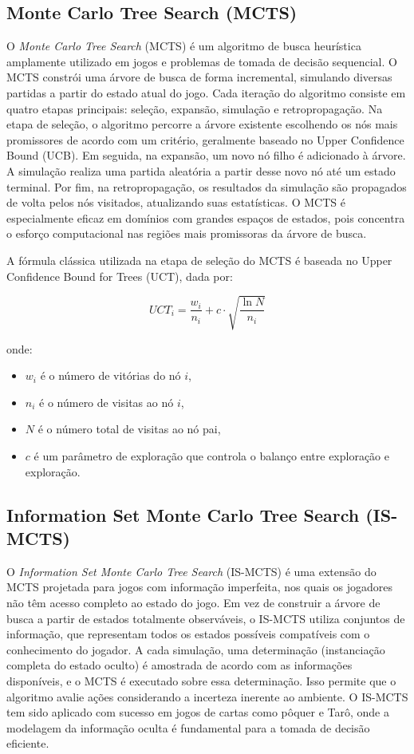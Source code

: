 \documentclass[12pt]{article}
\begin{document}
\subsection{Monte Carlo Tree Search (MCTS)}

O \textit{Monte Carlo Tree Search} (MCTS) é um algoritmo de busca heurística amplamente utilizado em jogos e problemas de tomada de decisão sequencial. O MCTS constrói uma árvore de busca de forma incremental, simulando diversas partidas a partir do estado atual do jogo. Cada iteração do algoritmo consiste em quatro etapas principais: seleção, expansão, simulação e retropropagação. Na etapa de seleção, o algoritmo percorre a árvore existente escolhendo os nós mais promissores de acordo com um critério, geralmente baseado no Upper Confidence Bound (UCB). Em seguida, na expansão, um novo nó filho é adicionado à árvore. A simulação realiza uma partida aleatória a partir desse novo nó até um estado terminal. Por fim, na retropropagação, os resultados da simulação são propagados de volta pelos nós visitados, atualizando suas estatísticas. O MCTS é especialmente eficaz em domínios com grandes espaços de estados, pois concentra o esforço computacional nas regiões mais promissoras da árvore de busca.

A fórmula clássica utilizada na etapa de seleção do MCTS é baseada no Upper Confidence Bound for Trees (UCT), dada por:

\begin{equation}
    UCT_i = \frac{w_i}{n_i} + c \cdot \sqrt{\frac{\ln N}{n_i}}
\end{equation}

onde:
\begin{itemize}
    \item $w_i$ é o número de vitórias do nó $i$,
    \item $n_i$ é o número de visitas ao nó $i$,
    \item $N$ é o número total de visitas ao nó pai,
    \item $c$ é um parâmetro de exploração que controla o balanço entre exploração e exploração.
\end{itemize}

\subsection{Information Set Monte Carlo Tree Search (IS-MCTS)}

O \textit{Information Set Monte Carlo Tree Search} (IS-MCTS) é uma extensão do MCTS projetada para jogos com informação imperfeita, nos quais os jogadores não têm acesso completo ao estado do jogo. Em vez de construir a árvore de busca a partir de estados totalmente observáveis, o IS-MCTS utiliza conjuntos de informação, que representam todos os estados possíveis compatíveis com o conhecimento do jogador. A cada simulação, uma determinação (instanciação completa do estado oculto) é amostrada de acordo com as informações disponíveis, e o MCTS é executado sobre essa determinação. Isso permite que o algoritmo avalie ações considerando a incerteza inerente ao ambiente. O IS-MCTS tem sido aplicado com sucesso em jogos de cartas como pôquer e Tarô, onde a modelagem da informação oculta é fundamental para a tomada de decisão eficiente.
\end{document}
